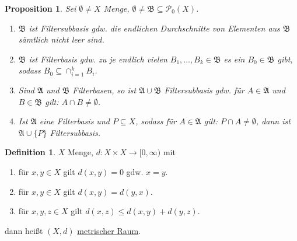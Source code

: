\documentclass[12pt]{scrartcl}%
\newtheorem{prop}{Proposition}
\theoremstyle{definition}
\newtheorem*{defn}{Definition}
\theoremstyle{remark}
\newcommand{\powerset}{\mathcal{P}}
\begin{document}
\begin{prop}
    Sei $\emptyset\neq X$ Menge, $\emptyset \neq \mathfrak{B}\subseteq \powerset_0(X)$.

    \begin{enumerate}[label=(\arabic*)]
        \item $\mathfrak{B}$ ist Filtersubbasis gdw. die endlichen Durchschnitte von Elementen aus $\mathfrak{B}$ sämt\-lich nicht leer sind.
        \item $\mathfrak{B}$ ist Filterbasis gdw. zu je endlich vielen $B_1,\dots,B_k\in\mathfrak{B}$ es ein $B_0\in\mathfrak{B}$ gibt, sodass $B_0\subseteq \cap_{i=1}^k B_i$.
        \item Sind $\mathfrak{A}$ und $\mathfrak{B}$ Filterbasen, so ist $\mathfrak{A} \cup \mathfrak{B}$ Filtersubbasis gdw. für $A\in\mathfrak{A}$ und $B\in\mathfrak{B}$ gilt: $A\cap B \neq \emptyset$.
        \item Ist $\mathfrak{A}$ eine Filterbasis und $P\subseteq X$, sodass für $A\in\mathfrak{A}$ gilt: $P\cap A \neq \emptyset$, dann ist $\mathfrak{A} \cup \{P\}$ Filtersubbasis.
    \end{enumerate}
\end{prop}

\begin{defn}
    $X$ Menge, $d: X\times X\to [0,\infty)$ mit

    \begin{enumerate}[label=(\arabic*)]
        \item für $x,y\in X$ gilt $d(x,y)=0$ gdw. $x=y$.
        \item für $x,y\in X$ gilt $d(x,y)=d(y,x)$.
        \item für $x,y,z\in X$ gilt $d(x,z) \leq d(x,y) + d(y,z)$.
    \end{enumerate}

    dann heißt $(X, d)$ \underline{metrischer Raum}.
\end{defn}
\end{document}
